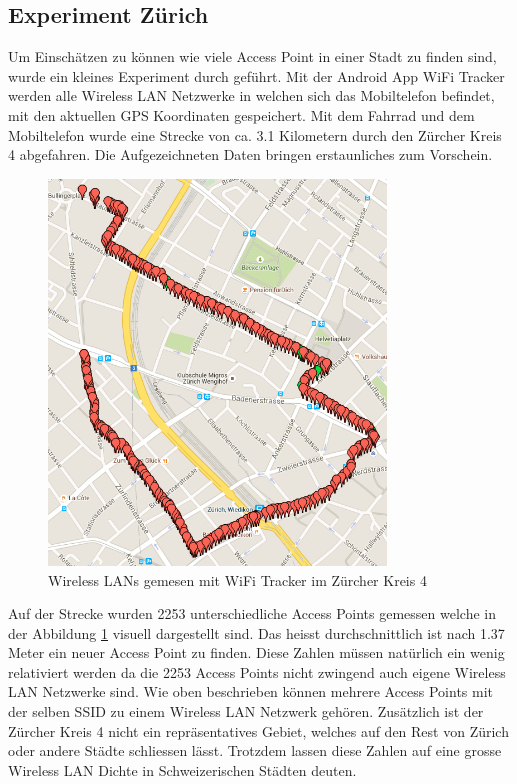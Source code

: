\subsection{Experiment Zürich}
Um Einschätzen zu können wie viele Access Point in einer Stadt zu finden sind, wurde ein kleines Experiment durch geführt. Mit der Android App WiFi Tracker\citep{google.play.wifitracker} werden alle Wireless LAN Netzwerke in welchen sich das Mobiltelefon befindet, mit den aktuellen GPS Koordinaten gespeichert. Mit dem Fahrrad und dem Mobiltelefon wurde eine Strecke von ca. 3.1 Kilometern durch den Zürcher Kreis 4 abgefahren. Die Aufgezeichneten Daten bringen erstaunliches zum Vorschein.
\begin{figure}[ht]
	\centering
	\includegraphics[width=0.8\textwidth]{images/wifikreis4.png}
	\caption{Wireless LANs gemesen mit WiFi Tracker im Zürcher Kreis 4}
	\label{fig:wifikreis4}
\end{figure}
Auf der Strecke wurden 2253 unterschiedliche Access Points gemessen welche in der Abbildung \ref{fig:wifikreis4} visuell dargestellt sind. Das heisst durchschnittlich ist nach 1.37 Meter ein neuer Access Point zu finden. Diese Zahlen müssen natürlich ein wenig relativiert werden da die 2253 Access Points nicht zwingend auch eigene Wireless LAN Netzwerke sind. Wie oben beschrieben können mehrere Access Points mit der selben SSID zu einem Wireless LAN Netzwerk gehören. Zusätzlich ist der Zürcher Kreis 4 nicht ein repräsentatives Gebiet, welches auf den Rest von Zürich oder andere Städte schliessen lässt. Trotzdem lassen diese Zahlen auf eine grosse Wireless LAN Dichte in Schweizerischen Städten deuten.


